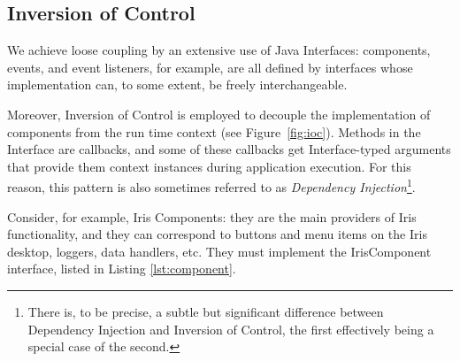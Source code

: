 \documentclass[preprint,authoryear,5p]{elsarticle}
\begin{document}
\subsection{Inversion of Control}

We achieve loose coupling by an extensive use of Java Interfaces: components,
events, and event listeners, for example, are all defined by interfaces whose
implementation can, to some extent, be freely interchangeable.

Moreover, Inversion of Control is employed to decouple
the implementation of components from the run time context (see Figure~\ref{fig:ioc}). 
Methods in the
Interface are callbacks, and some of these callbacks get Interface-typed
arguments that provide them context instances during application execution.
For this reason, this pattern is also sometimes referred to as \emph{Dependency
Injection}\footnote{There is, to be precise, a subtle but significant difference
between Dependency Injection and Inversion of Control, the first effectively
being a special case of the second.}.

Consider, for example, Iris Components: they are the main providers of Iris
functionality, and they can correspond to buttons and menu items on the Iris
desktop, loggers, data handlers, etc. They must implement the IrisComponent
interface, listed in Listing \ref{lst:component}.
\end{document}

